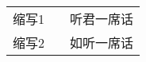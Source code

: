 
\hspace*{1.5cm}	
\begin{tabularx}{0.6\textwidth}{l X l}
			缩写1  &    &听君一席话\\
			缩写2  &    &如听一席话\\
\end{tabularx}
